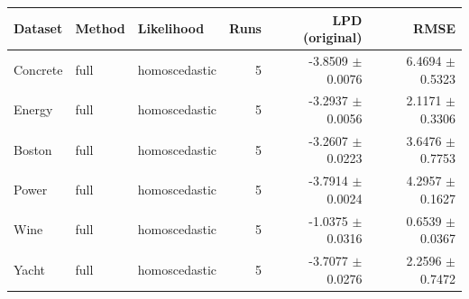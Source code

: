 \begin{tabular}{lllrrr}
\toprule
Dataset & Method & Likelihood & Runs & LPD (original) & RMSE \\
\midrule
Concrete & full & homoscedastic & 5 & -3.8509 $\pm$ 0.0076 & 6.4694 $\pm$ 0.5323 \\
Energy & full & homoscedastic & 5 & -3.2937 $\pm$ 0.0056 & 2.1171 $\pm$ 0.3306 \\
Boston & full & homoscedastic & 5 & -3.2607 $\pm$ 0.0223 & 3.6476 $\pm$ 0.7753 \\
Power & full & homoscedastic & 5 & -3.7914 $\pm$ 0.0024 & 4.2957 $\pm$ 0.1627 \\
Wine & full & homoscedastic & 5 & -1.0375 $\pm$ 0.0316 & 0.6539 $\pm$ 0.0367 \\
Yacht & full & homoscedastic & 5 & -3.7077 $\pm$ 0.0276 & 2.2596 $\pm$ 0.7472 \\
\bottomrule
\end{tabular}
